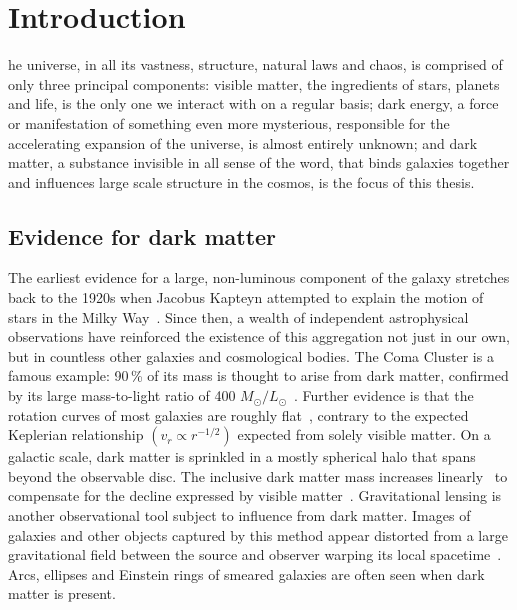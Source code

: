 %
%
\chapter{Introduction}
\label{chap:intro}


he universe, in all its vastness, structure, natural laws and chaos, is comprised of only three principal components: visible matter, the ingredients of stars, planets and life, is the only one we interact with on a regular basis; dark energy, a force or manifestation of something even more mysterious, responsible for the accelerating expansion of the universe, is almost entirely unknown; and dark matter, a substance invisible in all sense of the word, that binds galaxies together and influences large scale structure in the cosmos, is the focus of this thesis.




\section{Evidence for dark matter}
\label{sec:intro_dm_evidence}

The earliest evidence for a large, non-luminous component of the galaxy stretches back to the 1920s when Jacobus Kapteyn attempted to explain the motion of stars in the Milky Way~\cite{1922ApJ....55..302K}. Since then, a wealth of independent astrophysical observations have reinforced the existence of this aggregation not just in our own, but in countless other galaxies and cosmological bodies. The Coma Cluster is a famous example: 90\,\% of its mass is thought to arise from dark matter, confirmed by its large mass-to-light ratio of 400 $M_{\odot} / L_{\odot}$~\cite{Yozin:2015mla}. Further evidence is that the rotation curves of most galaxies are roughly flat~\cite{1996MNRAS-281-27P}, contrary to the expected Keplerian relationship $(v_r \propto r^{-1/2})$ expected from solely visible matter. On a galactic scale, dark matter is sprinkled in a mostly spherical halo that spans beyond the observable disc. The inclusive dark matter mass increases linearly~\cite{2009arXiv0901.0632E} to compensate for the decline expressed by visible matter~\cite{1970ApJ-160-811F,1992AandA-256-19B}. Gravitational lensing is another observational tool subject to influence from dark matter. Images of galaxies and other objects captured by this method appear distorted from a large gravitational field between the source and observer warping its local spacetime~\cite{2010GReGr..42.2177H}. Arcs, ellipses and Einstein rings of smeared galaxies are often seen when dark matter is present.

